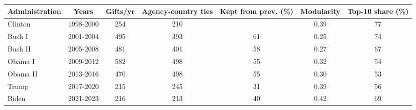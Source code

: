 \begin{tabular}{lcccccc}
\toprule
Administration & Years & Gifts/yr & Agency-country ties & Kept from prev. (\%) & Modularity & Top-10 share (\%) \\
\midrule
Clinton & 1998-2000 & 254 & 210 &  & 0.39 & 77 \\
Bush I & 2001-2004 & 495 & 393 & 61 & 0.25 & 74 \\
Bush II & 2005-2008 & 481 & 401 & 58 & 0.27 & 67 \\
Obama I & 2009-2012 & 582 & 498 & 55 & 0.32 & 54 \\
Obama II & 2013-2016 & 470 & 498 & 55 & 0.30 & 53 \\
Trump & 2017-2020 & 215 & 245 & 31 & 0.39 & 56 \\
Biden & 2021-2023 & 216 & 213 & 40 & 0.42 & 69 \\
\bottomrule
\end{tabular}
